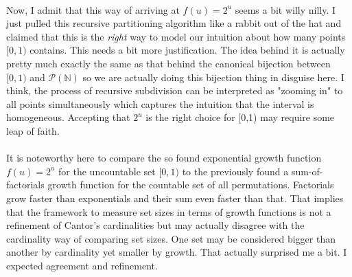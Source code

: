 \documentclass[12pt]{article}
\begin{document}

\paragraph{}
Now, I admit that this way of arriving at $f(u) = 2^u$ seems a bit willy nilly. I just pulled this recursive partitioning algorithm like a rabbit out of the hat and claimed that this is the \emph{right} way to model our intuition about how many points $[0,1)$ contains. This needs a bit more justification. The idea behind it is actually pretty much exactly the same as that behind the canonical bijection between $[0,1)$ and $\mathcal{P}(\mathbb{N})$ so we are actually doing this bijection thing in disguise here. I think, the process of recursive subdivision can be interpreted as "zooming in" to all points simultaneously which captures the intuition that the interval is homogeneous. Accepting that $2^u$ is the right choice for [0,1) may require some leap of faith.

\paragraph{}
It is noteworthy here to compare the so found exponential growth function $f(u) = 2^u$ for the uncountable set $[0,1)$ to the previously found a sum-of-factorials growth function for the countable set of all permutations. Factorials grow faster than exponentials and their sum even faster than that. That implies that the framework to measure set sizes in terms of growth functions is not a refinement of Cantor's cardinalities but may actually disagree with the cardinality way of comparing set sizes. One set may be considered bigger than another by cardinality yet smaller by growth. That actually surprised me a bit. I expected agreement and refinement.

\end{document}
